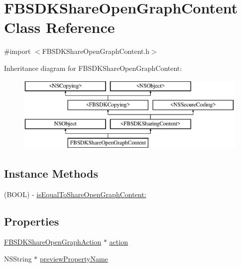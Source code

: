 \hypertarget{interface_f_b_s_d_k_share_open_graph_content}{}\section{F\+B\+S\+D\+K\+Share\+Open\+Graph\+Content Class Reference}
\label{interface_f_b_s_d_k_share_open_graph_content}


{\ttfamily \#import $<$F\+B\+S\+D\+K\+Share\+Open\+Graph\+Content.\+h$>$}

Inheritance diagram for F\+B\+S\+D\+K\+Share\+Open\+Graph\+Content\+:\begin{figure}[H]
\begin{center}
\leavevmode
\includegraphics[height=3.660131cm]{interface_f_b_s_d_k_share_open_graph_content}
\end{center}
\end{figure}
\subsection*{Instance Methods}
\begin{DoxyCompactItemize}
\item 
(B\+O\+O\+L) -\/ \hyperlink{interface_f_b_s_d_k_share_open_graph_content_a8f2227b11581744df6453cb93ab87fd5}{is\+Equal\+To\+Share\+Open\+Graph\+Content\+:}
\end{DoxyCompactItemize}
\subsection*{Properties}
\begin{DoxyCompactItemize}
\item 
\hyperlink{interface_f_b_s_d_k_share_open_graph_action}{F\+B\+S\+D\+K\+Share\+Open\+Graph\+Action} $\ast$ \hyperlink{interface_f_b_s_d_k_share_open_graph_content_ad9e4ab55026e417b3c04f7b73d53f392}{action}
\item 
N\+S\+String $\ast$ \hyperlink{interface_f_b_s_d_k_share_open_graph_content_a138537cb75dbeab1a52aaf27b3bb60e8}{preview\+Property\+Name}
\end{DoxyCompactItemize}


